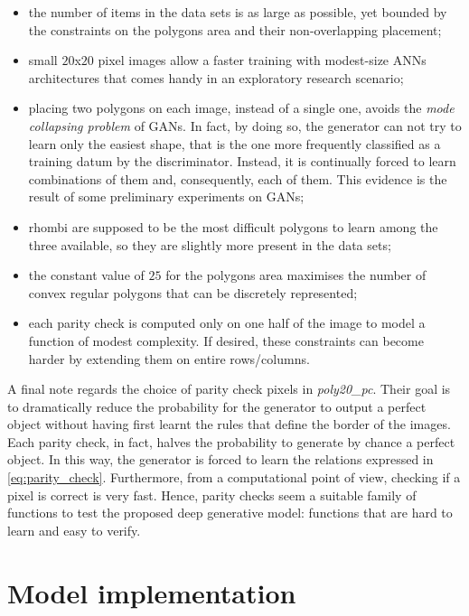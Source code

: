 \begin{itemize}
    \item the number of items in the data sets is as large as possible, yet bounded by the constraints on the polygons area and their non-overlapping placement;
    \item small $20$x$20$ pixel images allow a faster training with modest-size ANNs architectures that comes handy in an exploratory research scenario;
    \item placing two polygons on each image, instead of a single one, avoids the \textit{mode collapsing problem} of GANs. In fact, by doing so, the generator can not try to learn only the easiest shape, that is the one more frequently classified as a training datum by the discriminator. Instead, it is continually forced to learn combinations of them and, consequently, each of them. This evidence is the result of some preliminary experiments on GANs;
    \item rhombi are supposed to be the most difficult polygons to learn among the three available, so they are slightly more present in the data sets;
    \item the constant value of $25$ for the polygons area maximises the number of convex regular polygons that can be discretely represented;
    \item each parity check is computed only on one half of the image to model a function of modest complexity. If desired, these constraints can become harder by extending them on entire rows/columns.
\end{itemize}


A final note regards the choice of parity check pixels in \textit{poly20\_pc}. Their goal is to dramatically reduce the probability for the generator to output a perfect object without having first learnt the rules that define the border of the images. Each parity check, in fact, halves the probability to generate by chance a perfect object. In this way, the generator is forced to learn the relations expressed in \eqref{eq:parity_check}. Furthermore, from a computational point of view, checking if a pixel is correct is very fast. Hence, parity checks seem a suitable family of functions to test the proposed deep generative model: functions that are hard to learn and easy to verify.


\section{Model implementation}

